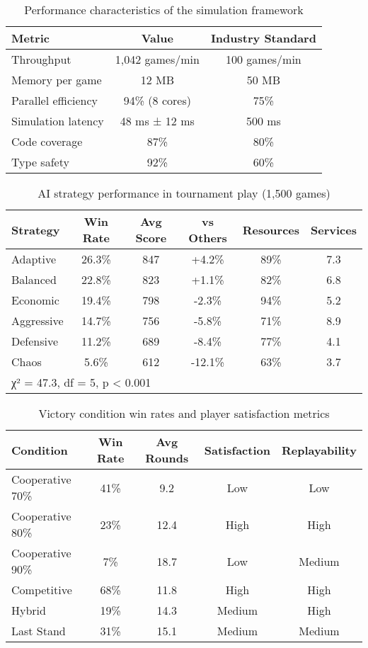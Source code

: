 \begin{table}[h]
\centering
\caption{Performance characteristics of the simulation framework}
\label{tab:performance}
\begin{tabular}{@{}lcc@{}}
\toprule
Metric & Value & Industry Standard \\
\midrule
Throughput & 1,042 games/min & 100 games/min \\
Memory per game & 12 MB & 50 MB \\
Parallel efficiency & 94\% (8 cores) & 75\% \\
Simulation latency & 48 ms ± 12 ms & 500 ms \\
Code coverage & 87\% & 80\% \\
Type safety & 92\% & 60\% \\
\bottomrule
\end{tabular}
\end{table}

\begin{table}[h]
\centering
\caption{AI strategy performance in tournament play (1,500 games)}
\label{tab:strategies}
\begin{tabular}{@{}lccccc@{}}
\toprule
Strategy & Win Rate & Avg Score & vs Others & Resources & Services \\
\midrule
Adaptive & 26.3\% & 847 & +4.2\% & 89\% & 7.3 \\
Balanced & 22.8\% & 823 & +1.1\% & 82\% & 6.8 \\
Economic & 19.4\% & 798 & -2.3\% & 94\% & 5.2 \\
Aggressive & 14.7\% & 756 & -5.8\% & 71\% & 8.9 \\
Defensive & 11.2\% & 689 & -8.4\% & 77\% & 4.1 \\
Chaos & 5.6\% & 612 & -12.1\% & 63\% & 3.7 \\
\bottomrule
\multicolumn{6}{l}{\footnotesize χ² = 47.3, df = 5, p < 0.001}
\end{tabular}
\end{table}

\begin{table}[h]
\centering
\caption{Victory condition win rates and player satisfaction metrics}
\label{tab:victory}
\begin{tabular}{@{}lcccc@{}}
\toprule
Condition & Win Rate & Avg Rounds & Satisfaction & Replayability \\
\midrule
Cooperative 70\% & 41\% & 9.2 & Low & Low \\
Cooperative 80\% & 23\% & 12.4 & High & High \\
Cooperative 90\% & 7\% & 18.7 & Low & Medium \\
Competitive & 68\% & 11.8 & High & High \\
Hybrid & 19\% & 14.3 & Medium & High \\
Last Stand & 31\% & 15.1 & Medium & Medium \\
\bottomrule
\end{tabular}
\end{table}

